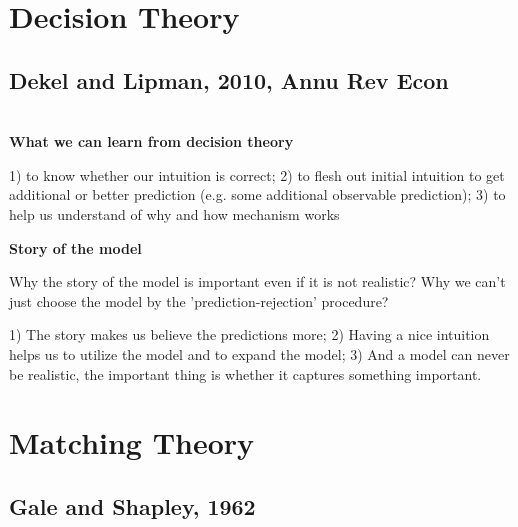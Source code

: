 \documentclass{book}
\theoremstyle{plain}
\theoremstyle{definition}
\begin{document}








\chapter{Decision Theory} %
\label{cha:decision_theory}

\section{Dekel and Lipman, 2010, Annu Rev Econ} %
\label{sec:dekel_and_lipman_2010_annu_rev_econ}

\textbf{}\\

\noindent
\textbf{What we can learn from decision theory}

1) to know whether our intuition is correct;
2) to flesh out initial intuition to get additional or better prediction (e.g. some additional observable prediction);
3) to help us understand of why and how mechanism works

\noindent
\textbf{Story of the model}

Why the story of the model is important even if it is not realistic? Why we can't just choose the model by the 'prediction-rejection' procedure?

1) The story makes us believe the predictions more;
2) Having a nice intuition helps us to utilize the model and to expand the model;
3) And a model can never be realistic, the important thing is whether it captures something important.




\chapter{Matching Theory} %
\label{cha:matching_theory}

\section{Gale and Shapley, 1962} %
\label{sec:gale_and_shapley_1962}

\textbf{}
\end{document}
